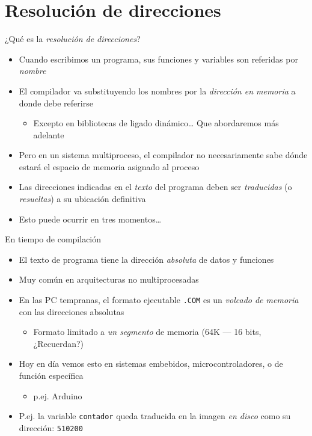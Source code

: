 \documentclass[presentation]{beamer}
\begin{document}
\section{Resolución de direcciones}
\label{sec:org118dea0}
\begin{frame}[label={sec:org4357b0a}]{¿Qué es la \emph{resolución de direcciones}?}
\begin{itemize}
\item Cuando escribimos un programa, sus funciones y variables son
referidas por \emph{nombre}
\item El compilador va substituyendo los nombres por la \emph{dirección en
memoria} a donde debe referirse
\begin{itemize}
\item Excepto en bibliotecas de ligado dinámico\ldots{} Que abordaremos más
adelante
\end{itemize}
\item Pero en un sistema multiproceso, el compilador no necesariamente
sabe dónde estará el espacio de memoria asignado al proceso
\item Las direcciones indicadas en el \emph{texto} del programa deben ser
\emph{traducidas} (o \emph{resueltas}) a su ubicación definitiva
\item Esto puede ocurrir en tres momentos\ldots{}
\end{itemize}
\end{frame}

\begin{frame}[label={sec:org7de4737},fragile]{En tiempo de compilación}
 \begin{itemize}
\item El texto de programa tiene la dirección \emph{absoluta} de datos y
funciones
\item Muy común en arquitecturas no multiprocesadas
\item En las PC tempranas, el formato ejecutable \texttt{.COM} es un \emph{volcado de
memoria} con las direcciones absolutas
\begin{itemize}
\item Formato limitado a \emph{un segmento} de memoria (64K — 16 bits,
¿Recuerdan?)
\end{itemize}
\item Hoy en día vemos esto en sistemas embebidos, microcontroladores, o
de función específica
\begin{itemize}
\item p.ej. Arduino
\end{itemize}
\item P.ej. la variable \texttt{contador} queda traducida en la imagen \emph{en
disco} como su dirección: \texttt{510200}
\end{itemize}
\end{frame}
\end{document}
